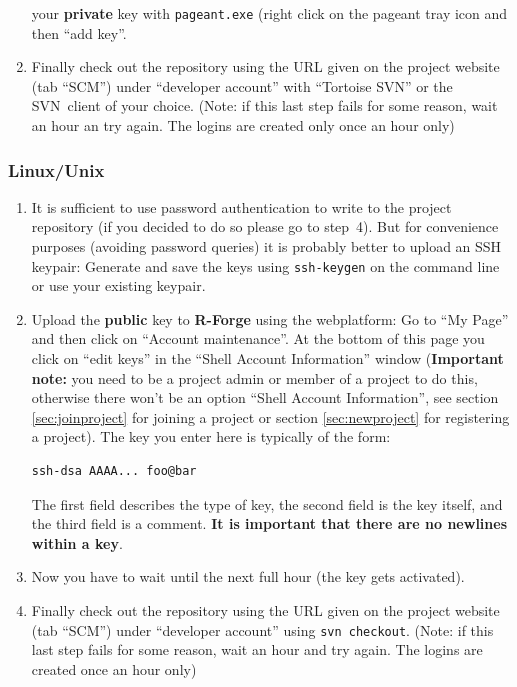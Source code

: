 \documentclass[a4paper]{article}
\begin{document}
\begin{enumerate}
  your \textbf{private} key with \texttt{pageant.exe} (right click on
  the pageant tray icon and then ``add key''.
\item Finally check out the repository using the URL given on the
  project website (tab ``SCM'') under ``developer account'' with
  ``Tortoise SVN'' or the SVN~client of your choice. (Note: if this last step
  fails for some reason, wait an hour an try again. The logins are
  created only once an hour only)
\end{enumerate}

\subsubsection{Linux/Unix}
\label{sec:scm-unix}

\begin{enumerate}
\item It is sufficient to use password authentication to write to the
  project repository (if you decided to do so please go to
  step~4). But for convenience purposes (avoiding password 
  queries) it is probably better to upload an SSH keypair: Generate
  and save the keys 
  using \texttt{ssh-keygen} on the command line or use your existing keypair.  
\item Upload the \textbf{public} key to \textbf{R-Forge} using the webplatform: Go to
  ``My Page'' and then click on ``Account maintenance''. At the bottom
  of this page you click on ``edit keys'' in the ``Shell Account
  Information'' window (\textbf{Important note:} you need to be a project admin
  or member of a project to do this, otherwise there won't be an
  option ``Shell Account Information'', see section
  \ref{sec:joinproject} for joining a project or section
  \ref{sec:newproject} for registering a project).
  The key you enter here is typically of the form:
\begin{verbatim}
ssh-dsa AAAA... foo@bar
\end{verbatim}
  The first field
  describes the type of key, the second field is the key itself, and
  the third field is a comment. \textbf{It is important that there are
    no newlines within a key}.
\item Now you have to wait until the next full hour (the key gets activated).
\item Finally check out the repository using the URL given on the
  project website (tab ``SCM'') under ``developer account'' using
  \texttt{svn checkout}. (Note: if this last step
  fails for some reason, wait an hour and try again. The logins are
  created once an hour only)
\end{enumerate}
\end{document}
